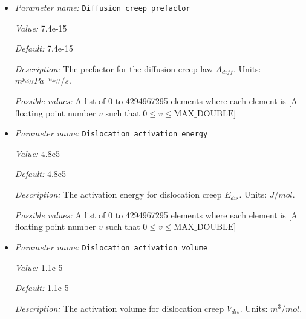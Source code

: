 \begin{itemize}
{\it Possible values:} A list of 0 to 4294967295 elements where each element is [A floating point number $v$ such that $0 \leq v \leq \text{MAX\_DOUBLE}$]
\item {\it Parameter name:} {\tt Diffusion creep prefactor}
\label{parameters:Material model/Grain size model/Diffusion creep prefactor}
\label{parameters:Material_20model/Grain_20size_20model/Diffusion_20creep_20prefactor}


{\it Value:} 7.4e-15


{\it Default:} 7.4e-15


{\it Description:} The prefactor for the diffusion creep law $A_{diff}$. Units: $m^{p_{diff}} Pa^{-n_{diff}}/s$.


{\it Possible values:} A list of 0 to 4294967295 elements where each element is [A floating point number $v$ such that $0 \leq v \leq \text{MAX\_DOUBLE}$]
\item {\it Parameter name:} {\tt Dislocation activation energy}
\label{parameters:Material model/Grain size model/Dislocation activation energy}
\label{parameters:Material_20model/Grain_20size_20model/Dislocation_20activation_20energy}


{\it Value:} 4.8e5


{\it Default:} 4.8e5


{\it Description:} The activation energy for dislocation creep $E_{dis}$. Units: $J/mol$.


{\it Possible values:} A list of 0 to 4294967295 elements where each element is [A floating point number $v$ such that $0 \leq v \leq \text{MAX\_DOUBLE}$]
\item {\it Parameter name:} {\tt Dislocation activation volume}
\label{parameters:Material model/Grain size model/Dislocation activation volume}
\label{parameters:Material_20model/Grain_20size_20model/Dislocation_20activation_20volume}


{\it Value:} 1.1e-5


{\it Default:} 1.1e-5


{\it Description:} The activation volume for dislocation creep $V_{dis}$. Units: $m^3/mol$.



\end{itemize}
